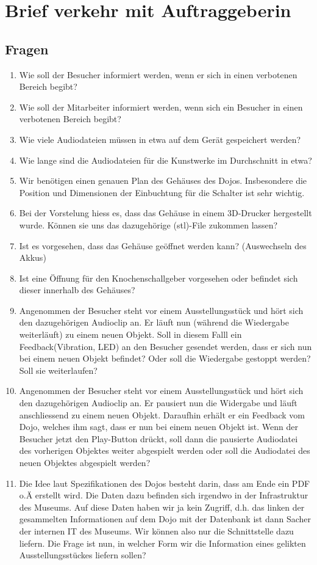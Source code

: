 \section{Brief verkehr mit Auftraggeberin}

\subsection*{Fragen}
\begin{enumerate} 
\item Wie soll der Besucher informiert werden, wenn er sich in einen verbotenen Bereich begibt?
\item Wie soll der Mitarbeiter informiert werden, wenn sich ein Besucher in einen verbotenen Bereich begibt?
\item Wie viele Audiodateien müssen in etwa auf dem Gerät gespeichert werden?
\item Wie lange sind die Audiodateien für die Kunstwerke im Durchschnitt in etwa?
\item Wir benötigen einen genauen Plan des Gehäuses des Dojos. Insbesondere die Position und Dimensionen der Einbuchtung für die Schalter ist sehr wichtig.
\item Bei der Vorstelung hiess es, dass das Gehäuse in einem 3D-Drucker hergestellt wurde. Können sie uns das dazugehörige (stl)-File zukommen lassen?
\item Ist es vorgesehen, dass das Gehäuse geöffnet werden kann? (Auswechseln des Akkus)
\item Ist eine Öffnung für den Knochenschallgeber vorgesehen oder befindet sich dieser innerhalb des Gehäuses?
\item Angenommen der Besucher steht vor einem Ausstellungsstück und hört sich den dazugehörigen Audioclip an. Er läuft nun (während die Wiedergabe weiterläuft) zu einem neuen Objekt. Soll in diesem Falll ein Feedback(Vibration, LED) an den Besucher gesendet werden, dass er sich nun bei einem neuen Objekt befindet? Oder soll die Wiedergabe gestoppt werden? Soll sie weiterlaufen?
\item Angenommen der Besucher steht vor einem Ausstellungsstück und hört sich den dazugehörigen Audioclip an. Er pausiert nun die Widergabe und läuft anschliessend zu einem neuen Objekt. Daraufhin erhält er ein Feedback vom Dojo, welches ihm sagt, dass er nun bei einem neuen Objekt ist. Wenn der Besucher jetzt den Play-Button drückt, soll dann die pausierte Audiodatei des vorherigen Objektes weiter abgespielt werden oder soll die Audiodatei des neuen Objektes abgespielt werden?
\item Die Idee laut Spezifikationen des Dojos besteht darin, dass am Ende ein PDF o.Ä erstellt wird. Die Daten dazu befinden sich irgendwo in der Infrastruktur des Museums. Auf diese Daten haben wir ja kein Zugriff, d.h. das linken der gesammelten Informationen auf dem Dojo mit der Datenbank ist dann Sacher der internen IT des Museums. Wir können also nur die Schnittstelle dazu liefern. Die Frage ist nun, in welcher Form wir die Information eines gelikten Ausstellungsstückes liefern sollen?
\end{enumerate}

